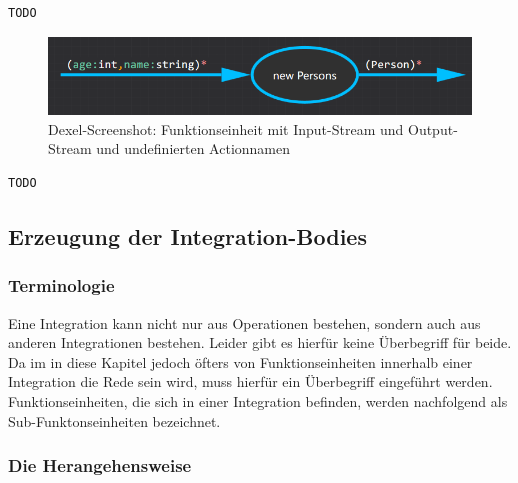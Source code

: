 	
	
	\begin{lstlisting}[caption=Mit Dexel generierter Code ]
	TODO
	\end{lstlisting}
	
			
			\begin{figure}[H]
				\centering
				\includegraphics[width=.9\linewidth]{./img/roslyn_StreamStream.png} 
				\caption{Dexel-Screenshot: Funktionseinheit mit Input-Stream und Output-Stream und undefinierten Actionnamen}
			\end{figure}
			

	\begin{lstlisting}[caption=Mit Dexel generierter Code ]
	TODO
	\end{lstlisting}
	 

\subsection{Erzeugung der Integration-Bodies}
\label{sec:orgheadline51}


	 \subsubsection{Terminologie}

	Eine Integration kann nicht nur aus
	Operationen bestehen, sondern auch aus anderen Integrationen bestehen.
	Leider gibt es hierfür keine Überbegriff für beide.
	Da im in diese Kapitel jedoch öfters von Funktionseinheiten innerhalb einer
	Integration die Rede sein wird, muss hierfür ein Überbegriff eingeführt
	werden. Funktionseinheiten, die sich in einer Integration befinden, werden
	nachfolgend als Sub-Funktonseinheiten bezeichnet.
	
	\subsubsection{Die Herangehensweise}

